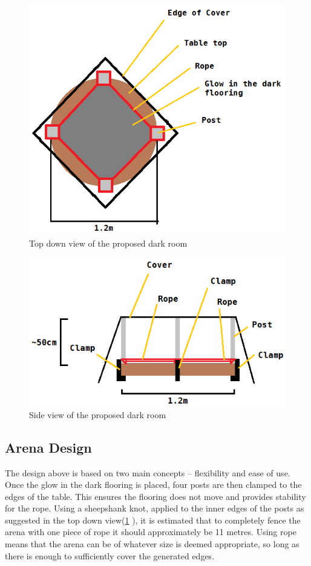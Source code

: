 \begin{figure}
  \includegraphics[scale=0.7]{img/ArenaTopDown.png}
  \caption{Top down view of the proposed dark room} \label{desSysTopImg}
\end{figure}
\begin{figure}
  \includegraphics[scale=0.7]{img/ArenaSideView.png}
  \caption{Side view of the proposed dark room} \label{desSysSideImg}
\end{figure}
\clearpage

\subsection{Arena Design}
The design above is based on two main concepts -- flexibility and ease of use.
Once the glow in the dark flooring is placed, four posts are then clamped to the
edges of the table.  This ensures the flooring does not move and provides
stability for the rope.  Using a sheepshank knot, applied to the inner edges of
the posts as suggested in the top down view(\ref{desSysTopImg} ), it is 
estimated that to completely fence the arena with one piece of rope it should
approximately be 11 metres.  Using rope means that the arena can be of whatever
size is deemed appropriate, so long as there is enough to sufficiently cover the
generated edges.

